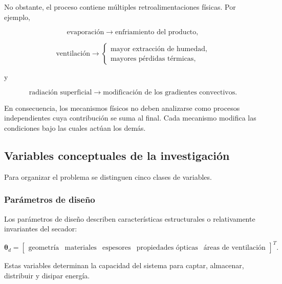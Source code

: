 No obstante, el proceso contiene múltiples retroalimentaciones físicas. Por ejemplo,

\begin{equation}
\text{evaporación}
\longrightarrow
\text{enfriamiento del producto},
\end{equation}

\begin{equation}
\text{ventilación}
\longrightarrow
\begin{cases}
\text{mayor extracción de humedad},\\
\text{mayores pérdidas térmicas},
\end{cases}
\end{equation}

y

\begin{equation}
\text{radiación superficial}
\longrightarrow
\text{modificación de los gradientes convectivos}.
\end{equation}

En consecuencia, los mecanismos físicos no deben analizarse como procesos independientes cuya contribución se suma al final. Cada mecanismo modifica las condiciones bajo las cuales actúan los demás.

\subsection{Variables conceptuales de la investigación}
\label{subsec:variables_conceptuales}

Para organizar el problema se distinguen cinco clases de variables.

\subsubsection{Parámetros de diseño}

Los parámetros de diseño describen características estructurales o relativamente invariantes del secador:

\begin{equation}
\boldsymbol{\theta}_d
=
\begin{bmatrix}
\text{geometría} &
\text{materiales} &
\text{espesores} &
\text{propiedades ópticas} &
\text{áreas de ventilación}
\end{bmatrix}^{T}.
\end{equation}

Estas variables determinan la capacidad del sistema para captar, almacenar, distribuir y disipar energía.

